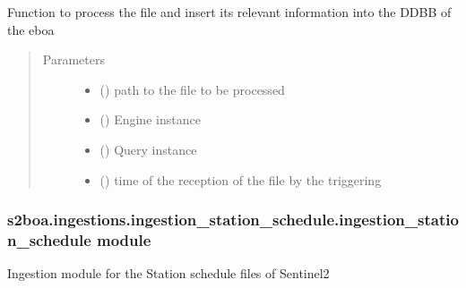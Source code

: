 \begin{fulllineitems}
\label{\detokenize{s2boa.ingestions:s2boa.ingestions.ingestion_station_acquisition_report.ingestion_station_acquisition_report.process_file}}
\sphinxAtStartPar
Function to process the file and insert its relevant information
into the DDBB of the eboa
\begin{quote}\begin{description}
\item[{Parameters}] \leavevmode\begin{itemize}
\item {} 
\sphinxAtStartPar
{} () \textendash{} path to the file to be processed

\item {} 
\sphinxAtStartPar
{} () \textendash{} Engine instance

\item {} 
\sphinxAtStartPar
{} () \textendash{} Query instance

\item {} 
\sphinxAtStartPar
{} () \textendash{} time of the reception of the file by the triggering

\end{itemize}

\end{description}\end{quote}

\end{fulllineitems}



\subsubsection{s2boa.ingestions.ingestion\_station\_schedule.ingestion\_station\_schedule module}
\label{\detokenize{s2boa.ingestions:module-s2boa.ingestions.ingestion_station_schedule.ingestion_station_schedule}}\label{\detokenize{s2boa.ingestions:s2boa-ingestions-ingestion-station-schedule-ingestion-station-schedule-module}}
\sphinxAtStartPar
Ingestion module for the Station schedule files of Sentinel\sphinxhyphen{}2


